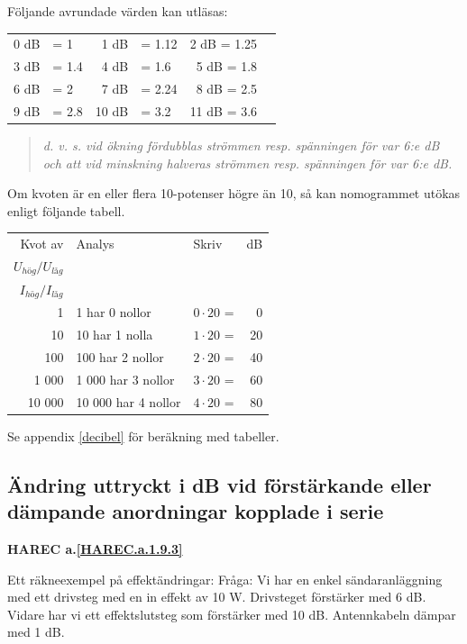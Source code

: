 Följande avrundade värden kan utläsas:

\begin{tabular}{rlrlrl}
0 dB & = 1   &  1 dB & = 1.12 &  2 dB = 1.25 \\
3 dB & = 1.4 &  4 dB & = 1.6  &  5 dB = 1.8 \\
6 dB & = 2   &  7 dB & = 2.24 &  8 dB = 2.5 \\
9 dB & = 2.8 & 10 dB & = 3.2  & 11 dB = 3.6
\end{tabular}

\begin{quote}\emph{
d. v. s. vid ökning fördubblas strömmen resp. spänningen för var 6:e dB och att
vid minskning halveras strömmen resp. spänningen för var 6:e dB.
}\end{quote}

Om kvoten är en eller flera 10-potenser högre än 10, så kan nomogrammet utökas
enligt följande tabell.

\begin{tabular}{rllr}
Kvot av & Analys             & Skriv            & dB \\
\(U_{hög}/U_{låg}\) &          &                  &    \\
\(I_{hög}/I_{låg}\) &          &                  &    \\
     1 & 1 har 0 nollor      & \(0 \cdot 20\) = &  0 \\
    10 & 10 har 1 nolla      & \(1 \cdot 20\) = & 20 \\
   100 & 100 har 2 nollor    & \(2 \cdot 20\) = & 40 \\
 1 000 &  1 000 har 3 nollor & \(3 \cdot 20\) = & 60 \\
10 000 & 10 000 har 4 nollor & \(4 \cdot 20\) = & 80
\end{tabular}

Se appendix \ref{decibel} för beräkning med tabeller.

\subsection{Ändring uttryckt i dB vid förstärkande eller dämpande anordningar kopplade i serie}
\textbf{HAREC a.\ref{HAREC.a.1.9.3}\label{myHAREC.a.1.9.3}}

Ett räkneexempel på effektändringar:
Fråga:
Vi har en enkel sändaranläggning med ett drivsteg med en in effekt av 10 W.
Drivsteget förstärker med 6 dB. Vidare har vi ett effektslutsteg som förstärker
med 10 dB. Antennkabeln dämpar med 1 dB.


